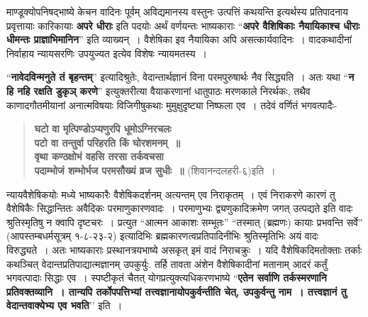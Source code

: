 {माण्डूक्योपनिषद्भाष्ये केचन वादिनः पूर्वम् अविद्यमानस्य वस्तुनः उत्पत्तिं कथयन्ति इत्यर्थस्य प्रतिपादनाय प्रवृत्तायाः कारिकायाः \textbf{अपरे धीराः} इति पदयोः अर्थं वर्णयन्तः भाष्यकाराः “\textbf{अपरे वैशिषिकाः नैयायिकाश्च धीराः धीमन्तः प्राज्ञाभिमानिन}” इति व्याख्यन्~। वैशेषिका इव नैयायिका अपि असत्कार्यवादिनः~। वादकथादीनां निर्वाहाय न्यायसरणिः उपयुज्यत इत्येव विशेषः न्यायमतस्य~। 

“\textbf{नावेदविन्मनुते तं बृहन्तम्}” इत्यादिश्रुतेः, वेदान्तार्थज्ञानं विना परमपुरुषार्थः नैव सिद्ध्यति~। अतः यथा “\textbf{न हि नहि रक्षति डुकृञ् करणे}” इत्युक्तरीत्या वैयाकरणानां धातुपाठः मरणकाले निरर्थकः, तथैव काणादगौतमीयानां अनात्मविषयाः विजिगीषुकथाः मुमुक्षुदृष्ट्या निष्फला एव~। तदेवं वर्णितं भगवत्पादैः-
\begin{verse}
\textbf{घटो वा मृत्पिण्डोऽप्यणुरपि धूमोऽग्निरचलः\\
पटो वा तन्तुर्वा परिहरति किं घोरशमनम्~॥\\
वृथा कण्ठक्षोभं वहसि तरसा तर्कवचसा\\
पदाम्भोजं शम्भोर्भज परमसौख्यं व्रज सुधीः~॥} (शिवानन्दलहरी-६)इति~। 
\end{verse}
न्यायवैशेषिकयोः मध्ये भाष्यकारैः वैशेषिकदर्शनम् अत्यन्तम् एव निराकृतम्~। एवं निराकरणे कारणं तु वैशेषिकैः सिद्धान्तितः अवैदिकः परमाणुकारणवादः~। परमाणुभ्यः द्व्यणुकादिक्रमेण जगत् उत्पद्यते इति वादः श्रुतिस्मृतिषु न क्वापि दृष्टचरः~। प्रत्युत “आत्मन आकाशः सम्भूतः” “तस्मात् (ब्रह्मणः) कायाः प्रभवन्ति सर्वे” (आपस्तम्बधर्मसूत्रम् १-८-२३-२) इत्यादिभिः ब्रह्मकारणत्वप्रतिपादिनीभिः श्रुतिस्मृतिभिः अयं वादः विरुद्ध्यते~। अतः भाष्यकाराः प्रस्थानत्रयभाष्ये असकृत् इमं वादं निराचक्रुः~। यदि वैशेषिकदिमतोक्ताः तर्काः कथञ्चित् वेदान्तप्रतिपाद्यात्मज्ञानम् उपकुर्युः. तर्हि तावता अंशेन वैशेषिकादीनां मतानाम् आदरं कर्तुं भगवत्पादाः सिद्धाः एव~। स्पष्टीकृतं चैतत् योगप्रत्युक्त्यधिकरणभाष्ये “\textbf{एतेन सर्वाणि तर्कस्मरणानि प्रतिवक्तव्यानि~। तान्यपि तर्कोपपत्तिभ्यां तत्त्वज्ञानायोपकुर्वन्तीति चेत्, उपकुर्वन्तु नाम~। तत्त्वज्ञानं तु वेदान्तवाक्येभ्य एव भवति}’’ इति~। 

\articleend
}
